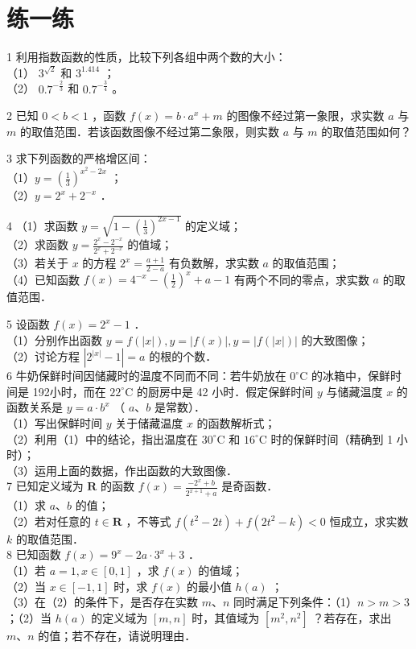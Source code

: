 \documentclass[10pt]{article}
\begin{document}
\section*{练一练}
1 利用指数函数的性质，比较下列各组中两个数的大小：\\
（1） \(3^{\sqrt{2}}\) 和 \(3^{1.414}\) ；\\
（2） \(0.7^{-\frac{2}{3}}\) 和 \(0.7^{-\frac{3}{4}}\) 。

2 已知 \(0<b<1\) ，函数 \(f(x)=b \cdot a^{x}+m\) 的图像不经过第一象限，求实数 \(a\) 与 \(m\) 的取值范围．若该函数图像不经过第二象限，则实数 \(a\) 与 \(m\) 的取值范围如何？

3 求下列函数的严格增区间：\\
（1）\(y=\left(\frac{1}{3}\right)^{x^{2}-2 x}\) ；\\
（2）\(y=2^{x}+2^{-x}\) ．

4 （1）求函数 \(y=\sqrt{1-\left(\frac{1}{3}\right)^{2 x-1}}\) 的定义域；\\
（2）求函数 \(y=\frac{2^{x}-2^{-x}}{2^{x}+2^{-x}}\) 的值域；\\
（3）若关于 \(x\) 的方程 \(2^{x}=\frac{a+1}{2-a}\) 有负数解，求实数 \(a\) 的取值范围；\\
（4）已知函数 \(f(x)=4^{-x}-\left(\frac{1}{2}\right)^{x}+a-1\) 有两个不同的零点，求实数 \(a\) 的取值范围．

5 设函数 \(f(x)=2^{x}-1\) ．\\
（1）分别作出函数 \(y=f(|x|), y=|f(x)|, y=|f(|x|)|\) 的大致图像；\\
（2）讨论方程 \(\left|2^{|x|}-1\right|=a\) 的根的个数．\\
6 牛奶保鲜时间因储藏时的温度不同而不同：若牛奶放在 \(0^{\circ} \mathrm{C}\) 的冰箱中，保鲜时间是 192小时，而在 \(22^{\circ} \mathrm{C}\) 的厨房中是 42 小时．假定保鲜时间 \(y\) 与储藏温度 \(x\) 的函数关系是 \(y=a \cdot b^{x}\) （ \(a 、 b\) 是常数）．\\
（1）写出保鲜时间 \(y\) 关于储藏温度 \(x\) 的函数解析式；\\
（2）利用（1）中的结论，指出温度在 \(30^{\circ} \mathrm{C}\) 和 \(16^{\circ} \mathrm{C}\) 时的保鲜时间（精确到 1 小时）；\\
（3）运用上面的数据，作出函数的大致图像．\\
7 已知定义域为 \(\mathbf{R}\) 的函数 \(f(x)=\frac{-2^{x}+b}{2^{x+1}+a}\) 是奇函数．\\
（1）求 \(a 、 b\) 的值；\\
（2）若对任意的 \(t \in \mathbf{R}\) ，不等式 \(f\left(t^{2}-2 t\right)+f\left(2 t^{2}-k\right)<0\) 恒成立，求实数 \(k\) 的取值范围．\\
8 已知函数 \(f(x)=9^{x}-2 a \cdot 3^{x}+3\) ．\\
（1）若 \(a=1, x \in[0,1]\) ，求 \(f(x)\) 的值域；\\
（2）当 \(x \in[-1,1]\) 时，求 \(f(x)\) 的最小值 \(h(a)\) ；\\
（3）在（2）的条件下，是否存在实数 \(m 、 n\) 同时满足下列条件：（1）\(n>m>3\) ；（2）当 \(h(a)\) 的定义域为 \([m, n]\) 时，其值域为 \(\left[m^{2}, n^{2}\right]\) ？若存在，求出 \(m 、 n\) 的值；若不存在，请说明理由．
\end{document}
